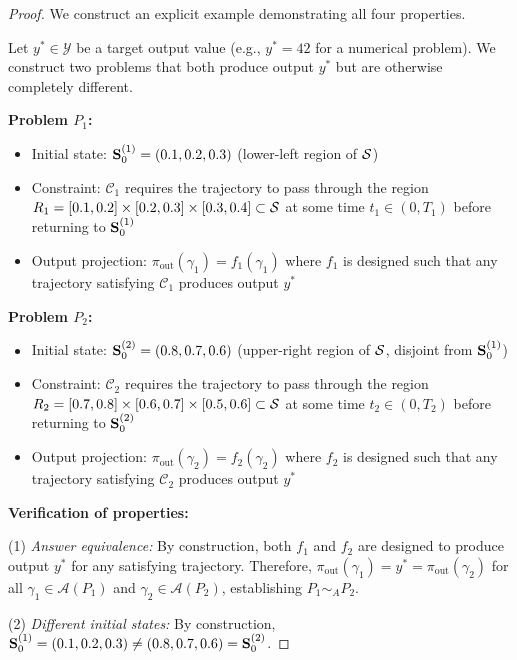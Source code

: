 \begin{proof}
We construct an explicit example demonstrating all four properties.

Let $y^* \in \mathcal{Y}$ be a target output value (e.g., $y^* = 42$ for a numerical problem). We construct two problems that both produce output $y^*$ but are otherwise completely different.

\textbf{Problem $P_1$:} 
\begin{itemize}
    \item Initial state: $\mathbf{S}_0^{(1)} = (0.1, 0.2, 0.3)$ (lower-left region of $\mathcal{S}$)
    \item Constraint: $\mathcal{C}_1$ requires the trajectory to pass through the region $R_1 = [0.1, 0.2] \times [0.2, 0.3] \times [0.3, 0.4] \subset \mathcal{S}$ at some time $t_1 \in (0, T_1)$ before returning to $\mathbf{S}_0^{(1)}$
    \item Output projection: $\pi_{\text{out}}(\gamma_1) = f_1(\gamma_1)$ where $f_1$ is designed such that any trajectory satisfying $\mathcal{C}_1$ produces output $y^*$
\end{itemize}

\textbf{Problem $P_2$:}
\begin{itemize}
    \item Initial state: $\mathbf{S}_0^{(2)} = (0.8, 0.7, 0.6)$ (upper-right region of $\mathcal{S}$, disjoint from $\mathbf{S}_0^{(1)}$)
    \item Constraint: $\mathcal{C}_2$ requires the trajectory to pass through the region $R_2 = [0.7, 0.8] \times [0.6, 0.7] \times [0.5, 0.6] \subset \mathcal{S}$ at some time $t_2 \in (0, T_2)$ before returning to $\mathbf{S}_0^{(2)}$
    \item Output projection: $\pi_{\text{out}}(\gamma_2) = f_2(\gamma_2)$ where $f_2$ is designed such that any trajectory satisfying $\mathcal{C}_2$ produces output $y^*$
\end{itemize}

\textbf{Verification of properties:}

(1) \textit{Answer equivalence:} By construction, both $f_1$ and $f_2$ are designed to produce output $y^*$ for any satisfying trajectory. Therefore, $\pi_{\text{out}}(\gamma_1) = y^* = \pi_{\text{out}}(\gamma_2)$ for all $\gamma_1 \in \mathcal{A}(P_1)$ and $\gamma_2 \in \mathcal{A}(P_2)$, establishing $P_1 \sim_A P_2$.

(2) \textit{Different initial states:} By construction, $\mathbf{S}_0^{(1)} = (0.1, 0.2, 0.3) \neq (0.8, 0.7, 0.6) = \mathbf{S}_0^{(2)}$.


\end{proof}
